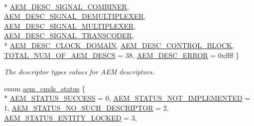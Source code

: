 \begin{DoxyCompactItemize}
\\*
\hyperlink{namespaceavdecc__lib_ac7b7d227e46bc72b63ee9e9aae15902fa7170885b8736b7693c761a0e8940c349}{A\+E\+M\+\_\+\+D\+E\+S\+C\+\_\+\+S\+I\+G\+N\+A\+L\+\_\+\+C\+O\+M\+B\+I\+N\+ER}, 
\hyperlink{namespaceavdecc__lib_ac7b7d227e46bc72b63ee9e9aae15902fa74badb116993f257abc5505637134bb9}{A\+E\+M\+\_\+\+D\+E\+S\+C\+\_\+\+S\+I\+G\+N\+A\+L\+\_\+\+D\+E\+M\+U\+L\+T\+I\+P\+L\+E\+X\+ER}, 
\hyperlink{namespaceavdecc__lib_ac7b7d227e46bc72b63ee9e9aae15902fa8093d7155519c2c61003609d87a9fd0a}{A\+E\+M\+\_\+\+D\+E\+S\+C\+\_\+\+S\+I\+G\+N\+A\+L\+\_\+\+M\+U\+L\+T\+I\+P\+L\+E\+X\+ER}, 
\hyperlink{namespaceavdecc__lib_ac7b7d227e46bc72b63ee9e9aae15902fa5a495e3da5797b752fb608c9fcd08975}{A\+E\+M\+\_\+\+D\+E\+S\+C\+\_\+\+S\+I\+G\+N\+A\+L\+\_\+\+T\+R\+A\+N\+S\+C\+O\+D\+ER}, 
\\*
\hyperlink{namespaceavdecc__lib_ac7b7d227e46bc72b63ee9e9aae15902fa9a2f5c4896329bb03b27b36e98ed5e93}{A\+E\+M\+\_\+\+D\+E\+S\+C\+\_\+\+C\+L\+O\+C\+K\+\_\+\+D\+O\+M\+A\+IN}, 
\hyperlink{namespaceavdecc__lib_ac7b7d227e46bc72b63ee9e9aae15902fa7857c128bbdcbdf6e584be2d4e564c9d}{A\+E\+M\+\_\+\+D\+E\+S\+C\+\_\+\+C\+O\+N\+T\+R\+O\+L\+\_\+\+B\+L\+O\+CK}, 
\hyperlink{namespaceavdecc__lib_ac7b7d227e46bc72b63ee9e9aae15902fa1e5a2c47a663ddd337dec63b09b44823}{T\+O\+T\+A\+L\+\_\+\+N\+U\+M\+\_\+\+O\+F\+\_\+\+A\+E\+M\+\_\+\+D\+E\+S\+CS} = 38, 
\hyperlink{namespaceavdecc__lib_ac7b7d227e46bc72b63ee9e9aae15902fa5839f926eced0677a78305450732ca4f}{A\+E\+M\+\_\+\+D\+E\+S\+C\+\_\+\+E\+R\+R\+OR} = 0xffff
 \}\begin{DoxyCompactList}\small\item\em The descriptor types values for A\+EM descriptors. \end{DoxyCompactList}
\item 
enum \hyperlink{namespaceavdecc__lib_affd436edb2cecd20cfd784a84f852b2b}{aem\+\_\+cmds\+\_\+status} \{ \\*
\hyperlink{namespaceavdecc__lib_affd436edb2cecd20cfd784a84f852b2bac947077909cb590b84f4b5db413080e0}{A\+E\+M\+\_\+\+S\+T\+A\+T\+U\+S\+\_\+\+S\+U\+C\+C\+E\+SS} = 0, 
\hyperlink{namespaceavdecc__lib_affd436edb2cecd20cfd784a84f852b2ba1de0a38d458af43bc8965b715fd37b4f}{A\+E\+M\+\_\+\+S\+T\+A\+T\+U\+S\+\_\+\+N\+O\+T\+\_\+\+I\+M\+P\+L\+E\+M\+E\+N\+T\+ED} = 1, 
\hyperlink{namespaceavdecc__lib_affd436edb2cecd20cfd784a84f852b2ba237719786e28d0dd7af47c5d19d2f6b0}{A\+E\+M\+\_\+\+S\+T\+A\+T\+U\+S\+\_\+\+N\+O\+\_\+\+S\+U\+C\+H\+\_\+\+D\+E\+S\+C\+R\+I\+P\+T\+OR} = 2, 
\hyperlink{namespaceavdecc__lib_affd436edb2cecd20cfd784a84f852b2ba75fd105d41f1c93ed9ccbb889cfc8903}{A\+E\+M\+\_\+\+S\+T\+A\+T\+U\+S\+\_\+\+E\+N\+T\+I\+T\+Y\+\_\+\+L\+O\+C\+K\+ED} = 3, 

\end{DoxyCompactItemize}
